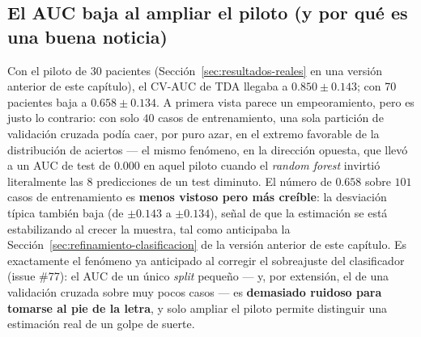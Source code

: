 \begin{table}[H]
\centering
\caption[Clasificación benigno/maligno sobre CBIS-DDSM]{Resultados reales sobre el piloto de CBIS-DDSM (70 pacientes,
\texttt{scripts/run\_pipeline.py} y \texttt{scripts/fuse\_and\_evaluate.py},
\texttt{n\_bins=4}, Random Forest por defecto). El AUC por validación
cruzada (5-fold sobre train) es la columna fiable; el test de solo $21$
casos sigue siendo ruidoso (ver discusión debajo de la tabla).}
\label{tab:resultados}
\end{table}

\subsection{El AUC baja al ampliar el piloto (y por qué es una buena noticia)}
\label{sec:test-ruidoso}
Con el piloto de 30 pacientes (Sección~\ref{sec:resultados-reales} en una
versión anterior de este capítulo), el CV-AUC de TDA llegaba a
$0.850 \pm 0.143$; con 70 pacientes baja a $0.658 \pm 0.134$. A primera
vista parece un empeoramiento, pero es justo lo contrario: con solo $40$
casos de entrenamiento, una sola partición de validación cruzada podía caer,
por puro azar, en el extremo favorable de la distribución de aciertos ---
el mismo fenómeno, en la dirección opuesta, que llevó a un AUC de test de
$0.000$ en aquel piloto cuando el \textit{random forest} invirtió
literalmente las $8$ predicciones de un test diminuto. El número de $0.658$
sobre $101$ casos de entrenamiento es \textbf{menos vistoso pero más
creíble}: la desviación típica también baja (de $\pm 0.143$ a $\pm 0.134$),
señal de que la estimación se está estabilizando al crecer la muestra, tal
como anticipaba la Sección~\ref{sec:refinamiento-clasificacion} de la
versión anterior de este capítulo. Es exactamente el fenómeno ya anticipado
al corregir el sobreajuste del clasificador (issue \#77): el AUC de un
único \textit{split} pequeño --- y, por extensión, el de una validación
cruzada sobre muy pocos casos --- es \textbf{demasiado ruidoso para
tomarse al pie de la letra}, y solo ampliar el piloto permite distinguir
una estimación real de un golpe de suerte.


